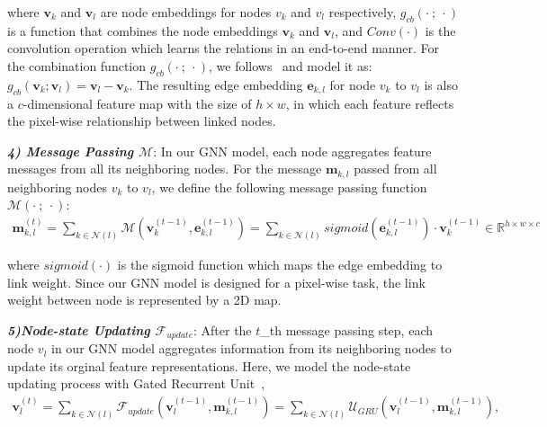 \documentclass[runningheads]{llncs}
\begin{document}
\noindent where $\mathbf v_k$ and $\mathbf v_l$ are node embeddings for nodes $v_k$ and $v_l$ respectively, $g_{cb}(\cdot~;~\cdot)$ is a function that combines the node embeddings $\mathbf v_k$ and $\mathbf v_l$, and $Conv(\cdot)$ is the convolution operation which learns the relations in an end-to-end manner. For the combination function $g_{cb}(\cdot~;~\cdot)$, we follows~\cite{wang2019dynamic} and model it as: $g_{cb}(\mathbf v_k;\mathbf v_l) = \mathbf v_l - \mathbf v_k$. The resulting edge embedding $\mathbf e_{k,l}$ for node $v_k$ to $v_l$ is also a $c$-dimensional feature map with the size of $h \times w$, in which each feature reflects the pixel-wise relationship between linked nodes. 

\noindent \emph{\textbf{\footnotesize 4) Message Passing $\mathcal M$}}:
In our GNN model, each node aggregates feature messages from all its neighboring nodes. For the message $\mathbf m_{k,l}$ passed from all neighboring nodes $v_k$ to $v_l$, we define the following message passing function $\mathcal M(\cdot~;~\cdot)$:
\begin{equation}
\begin{aligned}
\mathbf m^{(t)}_{k,l} = \sum_{k \in \mathcal N{(l)}} \mathcal M (\mathbf v^{(t-1)}_k,  \mathbf e^{(t-1)}_{k,l}) = \sum_{k \in \mathcal N{(l)}} sigmoid (\mathbf e^{(t-1)}_{k,l})\cdot \mathbf v^{(t-1)}_k \in \mathbb{R}^{h\times w \times c}
\label{eq4}
\end{aligned}
\end{equation}

\noindent where $sigmoid(\cdot)$ is the sigmoid function which maps the edge embedding to link weight. Since our GNN model is designed for a pixel-wise task, the link weight between node is represented by a 2D map.

\noindent \emph{\textbf{\footnotesize 5)Node-state Updating ${\mathcal F}_{update}$}}: 
After the $t$\_th message passing step, each node $v_l$ in our GNN model aggregates information from its neighboring nodes to update its orginal feature representations. Here, we model the node-state updating process with Gated Recurrent Unit~\cite{ballas2015delving}, 
\begin{equation}
\begin{aligned}
\mathbf v_l^{(t)} = \sum_{k \in \mathcal N(l)} {\mathcal F}_{update} (\mathbf v_l^{(t-1)}, \mathbf {m}_{k,l}^{(t-1)}) = \sum_{k \in \mathcal N(l)} \mathcal{U}_{GRU}(\mathbf v_l^{(t-1)}, \mathbf {m}_{k,l}^{(t-1)}),
\label{eq5}
\end{aligned}
\end{equation}
\end{document}
